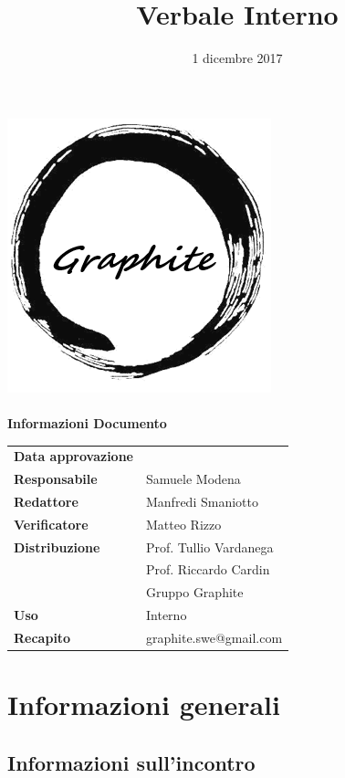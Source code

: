 \documentclass[openany,12pt,a4paper]{article}
\title{Verbale Interno}
\author{}
\date{1 dicembre 2017}
\begin{document}
	\makeatletter
	\begin{titlepage}
		\setlength{\headsep}{0pt}  
		\begin{center}
			\includegraphics[width=0.5\linewidth]{Logo.png}\\[1em]
			{\huge \bfseries  \@title }\\[10ex]
			\textbf{\Large Informazioni Documento} \\[2em]
			\bgroup
			\def\arraystretch{1.5}
			\begin{tabular}{l|l}
				\textbf{Data approvazione} & \large \@date \\
				\textbf{Responsabile} & Samuele Modena \\
				\textbf{Redattore} & Manfredi Smaniotto \\
				\textbf{Verificatore} & Matteo Rizzo \\
				\textbf{Distribuzione} & Prof. Tullio Vardanega \\
				 & Prof. Riccardo Cardin \\
				 & Gruppo Graphite \\
				\textbf{Uso} & Interno \\
				\textbf{Recapito} & graphite.swe@gmail.com \\
			\end{tabular}
		\egroup
		\end{center}
	\end{titlepage}
	\makeatother

	\thispagestyle{empty}
	\newpage
	
	\tableofcontents
	\newpage
	
	\section{Informazioni generali}
	
	\subsection{Informazioni sull'incontro}
	
\end{document}
